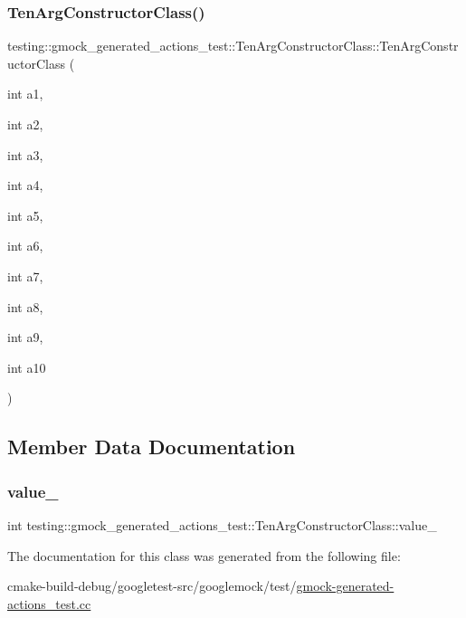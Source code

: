 \subsubsection{\texorpdfstring{TenArgConstructorClass()}{TenArgConstructorClass()}}
{\footnotesize\ttfamily testing\+::gmock\+\_\+generated\+\_\+actions\+\_\+test\+::\+Ten\+Arg\+Constructor\+Class\+::\+Ten\+Arg\+Constructor\+Class (\begin{DoxyParamCaption}\item[{int}]{a1,  }\item[{int}]{a2,  }\item[{int}]{a3,  }\item[{int}]{a4,  }\item[{int}]{a5,  }\item[{int}]{a6,  }\item[{int}]{a7,  }\item[{int}]{a8,  }\item[{int}]{a9,  }\item[{int}]{a10 }\end{DoxyParamCaption})\hspace{0.3cm}{\ttfamily [inline]}}



\subsection{Member Data Documentation}
\mbox{\label{classtesting_1_1gmock__generated__actions__test_1_1TenArgConstructorClass_ae3c388fd7e3cfbb95196712076a368ad}} 
\subsubsection{\texorpdfstring{value\_}{value\_}}
{\footnotesize\ttfamily int testing\+::gmock\+\_\+generated\+\_\+actions\+\_\+test\+::\+Ten\+Arg\+Constructor\+Class\+::value\+\_\+}



The documentation for this class was generated from the following file\+:\begin{DoxyCompactItemize}
\item 
cmake-\/build-\/debug/googletest-\/src/googlemock/test/\mbox{\hyperlink{gmock-generated-actions__test_8cc}{gmock-\/generated-\/actions\+\_\+test.\+cc}}\end{DoxyCompactItemize}

